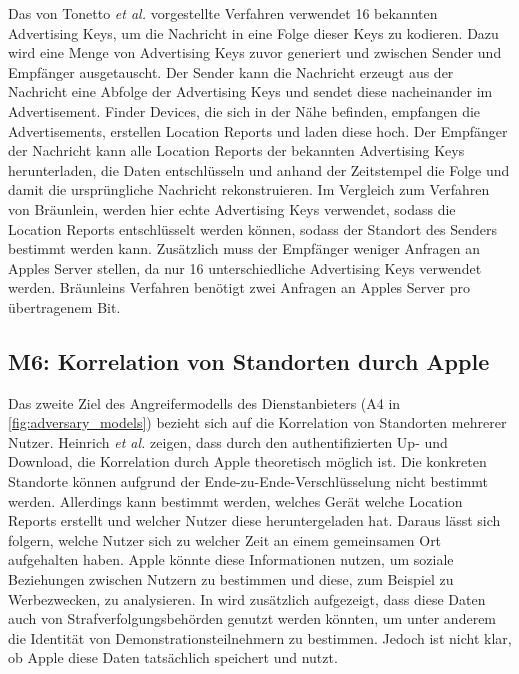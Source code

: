Das von Tonetto \textit{et al.} \cite{Tonetto_FindMy} vorgestellte Verfahren verwendet 16 bekannten Advertising Keys, um die Nachricht in eine Folge dieser Keys zu kodieren.
Dazu wird eine Menge von Advertising Keys zuvor generiert und zwischen Sender und Empfänger ausgetauscht.
Der Sender kann die Nachricht erzeugt aus der Nachricht eine Abfolge der Advertising Keys und sendet diese nacheinander im Advertisement.
Finder Devices, die sich in der Nähe befinden, empfangen die Advertisements, erstellen Location Reports und laden diese hoch.
Der Empfänger der Nachricht kann alle Location Reports der bekannten Advertising Keys herunterladen, die Daten entschlüsseln und anhand der Zeitstempel die Folge und damit die ursprüngliche Nachricht rekonstruieren.
Im Vergleich zum Verfahren von Bräunlein, werden hier echte Advertising Keys verwendet, sodass die Location Reports entschlüsselt werden können, sodass der Standort des Senders bestimmt werden kann.
Zusätzlich muss der Empfänger weniger Anfragen an Apples Server stellen, da nur 16 unterschiedliche Advertising Keys verwendet werden.
Bräunleins Verfahren benötigt zwei Anfragen an Apples Server pro übertragenem Bit.


\subsection{M6: Korrelation von Standorten durch Apple}
\label{missbrauch:6}

Das zweite Ziel des Angreifermodells des Dienstanbieters (A4 in \autoref{fig:adversary_models}) bezieht sich auf die Korrelation von Standorten mehrerer Nutzer.
Heinrich \textit{et al.} \cite{Heinrich_FindMy} zeigen, dass durch den authentifizierten Up- und Download, die Korrelation durch Apple theoretisch möglich ist.
Die konkreten Standorte können aufgrund der Ende-zu-Ende-Verschlüsselung nicht bestimmt werden.
Allerdings kann bestimmt werden, welches Gerät welche Location Reports erstellt und welcher Nutzer diese heruntergeladen hat.
Daraus lässt sich folgern, welche Nutzer sich zu welcher Zeit an einem gemeinsamen Ort aufgehalten haben.
Apple könnte diese Informationen nutzen, um soziale Beziehungen zwischen Nutzern zu bestimmen und diese, zum Beispiel zu Werbezwecken, zu analysieren.
In \cite{Heinrich_FindMy} wird zusätzlich aufgezeigt, dass diese Daten auch von Strafverfolgungsbehörden genutzt werden könnten, um unter anderem die Identität von Demonstrationsteilnehmern zu bestimmen.
Jedoch ist nicht klar, ob Apple diese Daten tatsächlich speichert und nutzt.